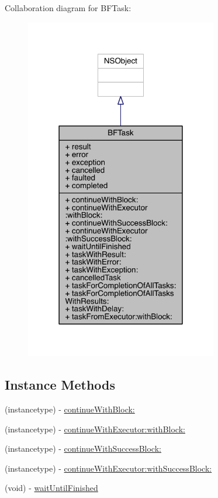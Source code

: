 Collaboration diagram for B\-F\-Task\-:
\nopagebreak
\begin{figure}[H]
\begin{center}
\leavevmode
\includegraphics[width=238pt]{interface_b_f_task__coll__graph}
\end{center}
\end{figure}
\subsection*{Instance Methods}
\begin{DoxyCompactItemize}
\item 
(instancetype) -\/ \hyperlink{interface_b_f_task_a2a365f99ecb75cc9309ec06bc0486340}{continue\-With\-Block\-:}
\item 
(instancetype) -\/ \hyperlink{interface_b_f_task_ac54630598ad15d751cc8a541c71043a9}{continue\-With\-Executor\-:with\-Block\-:}
\item 
(instancetype) -\/ \hyperlink{interface_b_f_task_ad898327275b645d21c9c06dfb1f05d83}{continue\-With\-Success\-Block\-:}
\item 
(instancetype) -\/ \hyperlink{interface_b_f_task_a350a8b82dfce94182299c94a7ec6eba4}{continue\-With\-Executor\-:with\-Success\-Block\-:}
\item 
(void) -\/ \hyperlink{interface_b_f_task_af2a6abc83d1dac02cb7ee49265a5eeed}{wait\-Until\-Finished}
\end{DoxyCompactItemize}
